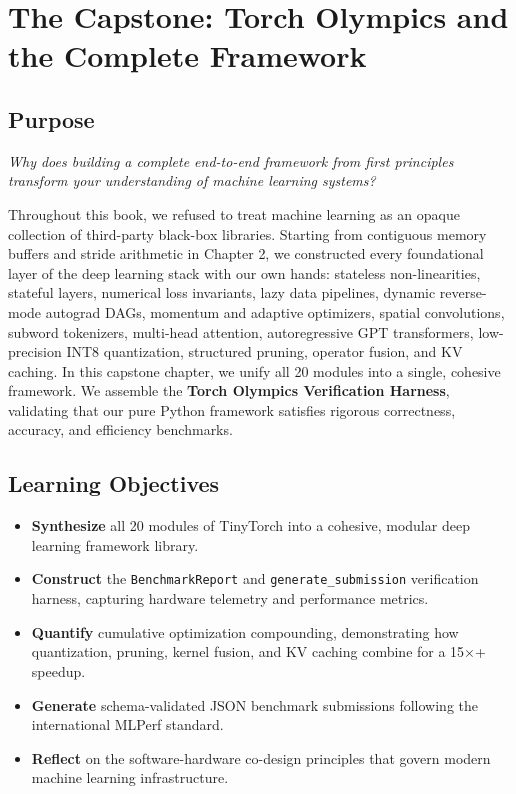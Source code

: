 \documentclass[
  letterpaper,
]{scrbook}
\providecommand{\tightlist}{%
  \setlength{\itemsep}{0pt}\setlength{\parskip}{0pt}}
\begin{document}
\chapter{The Capstone: Torch Olympics and the Complete
Framework}\label{the-capstone-torch-olympics-and-the-complete-framework}

\section*{Purpose}\label{purpose-22}


\emph{Why does building a complete end-to-end framework from first
principles transform your understanding of machine learning systems?}

Throughout this book, we refused to treat machine learning as an opaque
collection of third-party black-box libraries. Starting from contiguous
memory buffers and stride arithmetic in Chapter 2, we constructed every
foundational layer of the deep learning stack with our own hands:
stateless non-linearities, stateful layers, numerical loss invariants,
lazy data pipelines, dynamic reverse-mode autograd DAGs, momentum and
adaptive optimizers, spatial convolutions, subword tokenizers,
multi-head attention, autoregressive GPT transformers, low-precision
INT8 quantization, structured pruning, operator fusion, and KV caching.
In this capstone chapter, we unify all 20 modules into a single,
cohesive framework. We assemble the \textbf{Torch Olympics Verification
Harness}, validating that our pure Python framework satisfies rigorous
correctness, accuracy, and efficiency benchmarks.

\section{Learning Objectives}\label{learning-objectives-20}

\begin{itemize}
\tightlist
\item
  \textbf{Synthesize} all 20 modules of TinyTorch into a cohesive,
  modular deep learning framework library.
\item
  \textbf{Construct} the \texttt{BenchmarkReport} and
  \texttt{generate\_submission} verification harness, capturing hardware
  telemetry and performance metrics.
\item
  \textbf{Quantify} cumulative optimization compounding, demonstrating
  how quantization, pruning, kernel fusion, and KV caching combine for a
  15×+ speedup.
\item
  \textbf{Generate} schema-validated JSON benchmark submissions
  following the international MLPerf standard.
\item
  \textbf{Reflect} on the software-hardware co-design principles that
  govern modern machine learning infrastructure.
\end{itemize}
\end{document}

